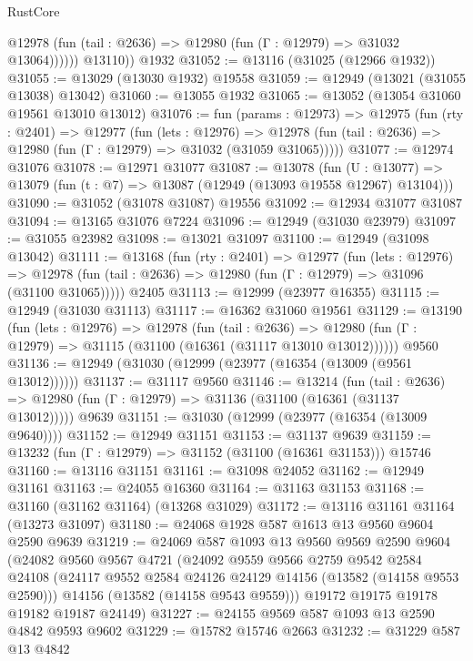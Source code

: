 \begin{lexlean}{RustCore}
\begin{coremodule}
              @12978 (fun (tail : @2636) => @12980 (fun (Γ : @12979) => @31032 @13064))))))
        @13110))
    @1932
@31052 := @13116 (@31025 (@12966 @1932))
@31055 := @13029 (@13030 @1932) @19558
@31059 := @12949 (@13021 (@31055 @13038) @13042)
@31060 := @13055 @1932
@31065 := @13052 (@13054 @31060 @19561 @13010 @13012)
@31076 := fun (params : @12973) =>
  @12975
    (fun (rty : @2401) =>
    @12977
      (fun (lets : @12976) =>
      @12978 (fun (tail : @2636) => @12980 (fun (Γ : @12979) => @31032 (@31059 @31065)))))
@31077 := @12974 @31076
@31078 := @12971 @31077
@31087 := @13078
    (fun (U : @13077) => @13079 (fun (t : @7) => @13087 (@12949 (@13093 @19558 @12967) @13104)))
@31090 := @31052 (@31078 @31087) @19556
@31092 := @12934 @31077 @31087
@31094 := @13165 @31076 @7224
@31096 := @12949 (@31030 @23979)
@31097 := @31055 @23982
@31098 := @13021 @31097
@31100 := @12949 (@31098 @13042)
@31111 := @13168
    (fun (rty : @2401) =>
    @12977
      (fun (lets : @12976) =>
      @12978 (fun (tail : @2636) => @12980 (fun (Γ : @12979) => @31096 (@31100 @31065)))))
    @2405
@31113 := @12999 (@23977 @16355)
@31115 := @12949 (@31030 @31113)
@31117 := @16362 @31060 @19561
@31129 := @13190
    (fun (lets : @12976) =>
    @12978
      (fun (tail : @2636) =>
      @12980 (fun (Γ : @12979) => @31115 (@31100 (@16361 (@31117 @13010 @13012))))))
    @9560
@31136 := @12949 (@31030 (@12999 (@23977 (@16354 (@13009 (@9561 @13012))))))
@31137 := @31117 @9560
@31146 := @13214
    (fun (tail : @2636) => @12980 (fun (Γ : @12979) => @31136 (@31100 (@16361 (@31137 @13012)))))
    @9639
@31151 := @31030 (@12999 (@23977 (@16354 (@13009 @9640))))
@31152 := @12949 @31151
@31153 := @31137 @9639
@31159 := @13232 (fun (Γ : @12979) => @31152 (@31100 (@16361 @31153))) @15746
@31160 := @13116 @31151
@31161 := @31098 @24052
@31162 := @12949 @31161
@31163 := @24055 @16360
@31164 := @31163 @31153
@31168 := @31160 (@31162 @31164) (@13268 @31029)
@31172 := @13116 @31161 @31164 (@13273 @31097)
@31180 := @24068 @1928 @587 @1613 @13 @9560 @9604 @2590 @9639
@31219 := @24069
    @587
    @1093
    @13
    @9560
    @9569
    @2590
    @9604
    (@24082
      @9560
      @9567
      @4721
      (@24092
        @9559
        @9566
        @2759
        @9542
        @2584
        @24108
        (@24117 @9552 @2584 @24126 @24129 @14156 (@13582 (@14158 @9553 @2590)))
        @14156
        (@13582 (@14158 @9543 @9559)))
      @19172
      @19175
      @19178
      @19182
      @19187
      @24149)
@31227 := @24155 @9569 @587 @1093 @13 @2590 @4842 @9593 @9602
@31229 := @15782 @15746 @2663
@31232 := @31229 @587 @13 @4842

\end{coremodule}
\end{lexlean}
